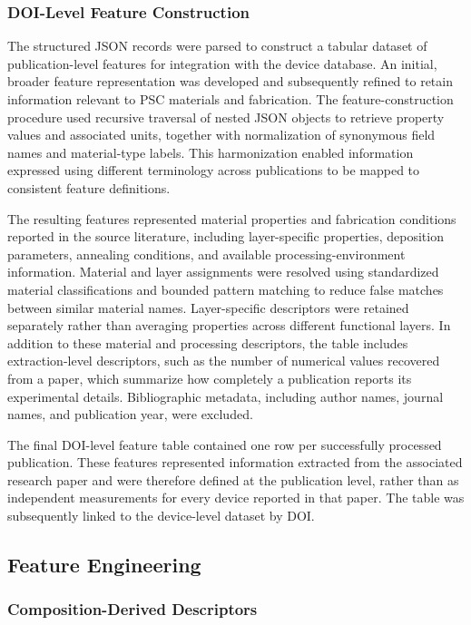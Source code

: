 \documentclass[3p]{elsarticle}
\begin{document}
\subsubsection{DOI-Level Feature Construction}

The structured JSON records were parsed to construct a tabular dataset of publication-level features for integration with the device database. An initial, broader feature representation was developed and subsequently refined to retain information relevant to PSC materials and fabrication. The feature-construction procedure used recursive traversal of nested JSON objects to retrieve property values and associated units, together with normalization of synonymous field names and material-type labels. This harmonization enabled information expressed using different terminology across publications to be mapped to consistent feature definitions.

The resulting features represented material properties and fabrication conditions reported in the source literature, including layer-specific properties, deposition parameters, annealing conditions, and available processing-environment information. Material and layer assignments were resolved using standardized material classifications and bounded pattern matching to reduce false matches between similar material names. Layer-specific descriptors were retained separately rather than averaging properties across different functional layers. In addition to these material and processing descriptors, the table includes extraction-level descriptors, such as the number of numerical values recovered from a paper, which summarize how completely a publication reports its experimental details. Bibliographic metadata, including author names, journal names, and publication year, were excluded.

The final DOI-level feature table contained one row per successfully processed publication. These features represented information extracted from the associated research paper and were therefore defined at the publication level, rather than as independent measurements for every device reported in that paper. The table was subsequently linked to the device-level dataset by DOI.


\subsection{Feature Engineering}

\subsubsection{Composition-Derived Descriptors}
\end{document}
